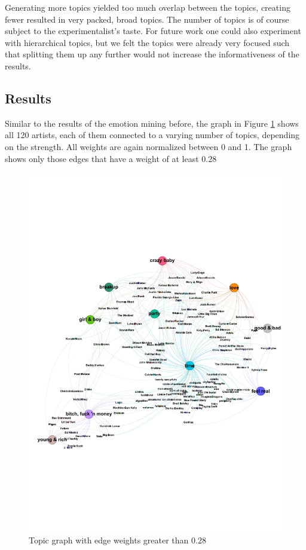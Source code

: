 \documentclass[10pt,a4paper]{article}
\begin{document}
	Generating more topics yielded too much overlap between the topics, creating fewer resulted in very packed, broad topics. The number of topics is of course subject to the experimentalist's taste. For future work one could also experiment with hierarchical topics, but we felt the topics were already very focused such that splitting them up any further would not increase the informativeness of the results.
	
		\subsection{Results}
		Similar to the results of the emotion mining before, the graph in Figure \ref{fig:topicgraph} shows all 120 artists, each of them connected to a varying number of topics, depending on the strength. All weights are again normalized between 0 and 1. The graph shows only those edges that have a weight of at least $0.28$
		
		\begin{figure}[htb]
			\centering
			\includegraphics[trim=0mm 60mm 0mm 50mm, clip, width=\linewidth]{data/topic_graph}
			\caption{Topic graph with edge weights greater than $0.28$}
			\label{fig:topicgraph}
		\end{figure}
		
\end{document}
